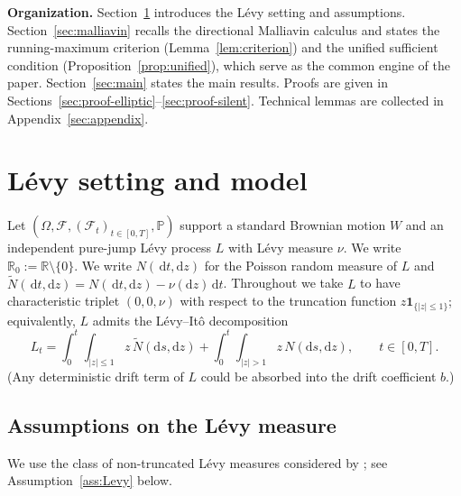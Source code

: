 \documentclass[11pt]{article}
\newcommand{\R}{\mathbb{R}}
\newcommand{\Pbb}{\mathbb{P}}
\newcommand{\1}{\mathbf{1}}
\newcommand{\dd}{\mathrm{d}}
\newcommand{\dt}{\,\dd t}
\theoremstyle{plain}
\theoremstyle{definition}
\theoremstyle{remark}
\begin{document}
\medskip
\noindent\textbf{Organization.}
Section~\ref{sec:setting} introduces the L\'evy setting and assumptions.
Section~\ref{sec:malliavin} recalls the directional Malliavin calculus and states the running-maximum criterion (Lemma~\ref{lem:criterion}) and the unified sufficient condition (Proposition~\ref{prop:unified}),
which serve as the common engine of the paper.
Section~\ref{sec:main} states the main results. Proofs are given in Sections~\ref{sec:proof-elliptic}--\ref{sec:proof-silent}.
Technical lemmas are collected in Appendix~\ref{sec:appendix}.

\section{L\'evy setting and model}\label{sec:setting}




Let $(\Omega,\mathcal{F},(\mathcal{F}_t)_{t\in[0,T]},\Pbb)$ support a standard Brownian motion $W$
and an independent pure-jump L\'evy process $L$ with L\'evy measure $\nu$.
We write $\R_0:=\R\setminus\{0\}$.
We write $N(\dt,\dd z)$ for the Poisson random measure of $L$ and $\tilde N(\dt,\dd z)=N(\dt,\dd z)-\nu(\dd z)\dt$.
Throughout we take $L$ to have characteristic triplet $(0,0,\nu)$ with respect to the truncation function
$z\1_{\{|z|\le 1\}}$; equivalently, $L$ admits the L\'evy--It\^o decomposition
\begin{equation}\label{eq:LevyIto}
L_t=\int_0^t\int_{|z|\le 1} z\,\tilde N(\dd s,\dd z)+\int_0^t\int_{|z|>1} z\,N(\dd s,\dd z),\qquad t\in[0,T].
\end{equation}
(Any deterministic drift term of $L$ could be absorbed into the drift coefficient $b$.)

\subsection{Assumptions on the L\'evy measure}


We use the class of non-truncated L\'evy measures considered by \cite{NakagawaSuzuki2024}; see Assumption~\ref{ass:Levy} below.
\end{document}
